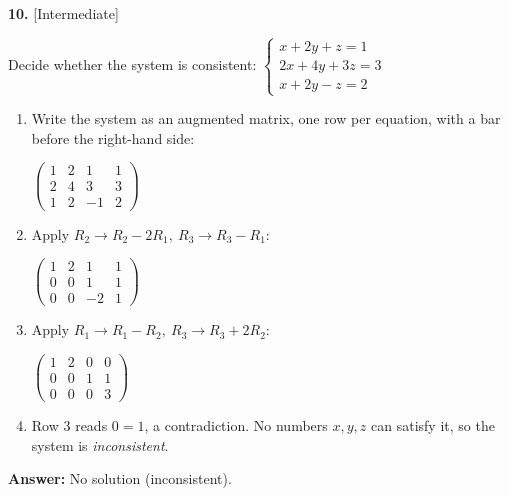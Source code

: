 \documentclass[11pt]{article}
\begin{document}
\par\vspace{2pt}
\begin{minipage}{\linewidth}\textbf{10.} \hfill{\scriptsize\color{ink}[Intermediate]}\par\nopagebreak Decide whether the system is consistent: $\begin{cases}x+2y+z=1\\ 2x+4y+3z=3\\ x+2y-z=2\end{cases}$
\end{minipage}\par\nopagebreak
\begin{tcolorbox}[breakable,colback=ans,colframe=ansb,boxrule=0.5pt,left=4pt,right=4pt,top=2pt,bottom=2pt]\begin{enumerate}[leftmargin=2.2em,itemsep=1pt,topsep=1pt,label=\textbf{Step \arabic*.}]\item Write the system as an augmented matrix, one row per equation, with a bar before the right-hand side:\par\smallskip $\displaystyle \left(\begin{array}{ccc|c}1 & 2 & 1 & 1 \\ 2 & 4 & 3 & 3 \\ 1 & 2 & -1 & 2\end{array}\right)$
\item Apply $R_2\to R_2-2R_1,\ R_3\to R_3-R_1$:\par\smallskip $\displaystyle \left(\begin{array}{ccc|c}1 & 2 & 1 & 1 \\ 0 & 0 & 1 & 1 \\ 0 & 0 & -2 & 1\end{array}\right)$
\item Apply $R_1\to R_1-R_2,\ R_3\to R_3+2R_2$:\par\smallskip $\displaystyle \left(\begin{array}{ccc|c}1 & 2 & 0 & 0 \\ 0 & 0 & 1 & 1 \\ 0 & 0 & 0 & 3\end{array}\right)$
\item Row 3 reads $0=1$, a contradiction. No numbers $x,y,z$ can satisfy it, so the system is \emph{inconsistent}.
\end{enumerate}\textbf{Answer:} No solution (inconsistent).\end{tcolorbox}
\par\vspace{2pt}
\end{document}
